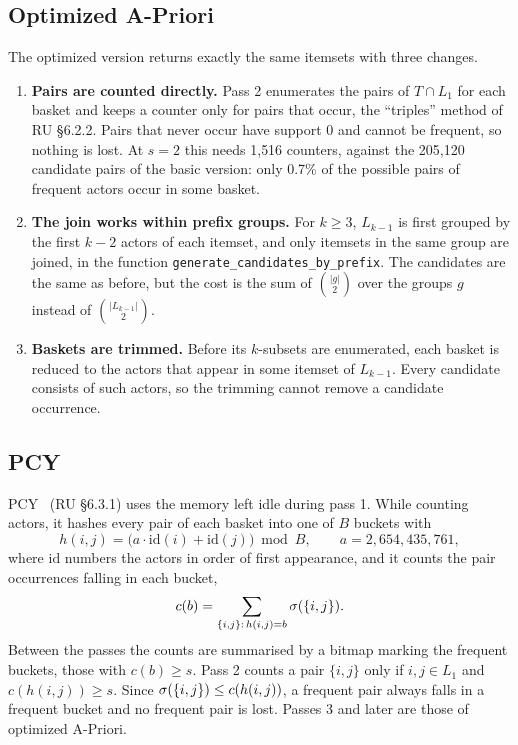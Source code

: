 \subsection{Optimized A-Priori}

The optimized version returns exactly the same itemsets with three changes.
\begin{enumerate}
  \item \textbf{Pairs are counted directly.} Pass 2 enumerates the pairs of $T \cap L_1$ for each basket and keeps a counter only for pairs that occur, the ``triples'' method of RU \S6.2.2. Pairs that never occur have support 0 and cannot be frequent, so nothing is lost. At $s = 2$ this needs 1{,}516 counters, against the 205{,}120 candidate pairs of the basic version: only 0.7\% of the possible pairs of frequent actors occur in some basket.
  \item \textbf{The join works within prefix groups.} For $k \ge 3$, $L_{k-1}$ is first grouped by the first $k - 2$ actors of each itemset, and only itemsets in the same group are joined, in the function
  \texttt{generate\_candidates\_by\_prefix}. The candidates are the same as before, but the cost is the sum of $\binom{|g|}{2}$ over the groups $g$ instead of $\binom{|L_{k-1}|}{2}$.
  \item \textbf{Baskets are trimmed.} Before its $k$-subsets are enumerated, each basket is reduced to the actors that appear in some itemset of $L_{k-1}$. Every candidate consists of such actors, so the trimming cannot remove a candidate occurrence.
\end{enumerate}

\subsection{PCY}

PCY~\cite{park1995} (RU \S6.3.1) uses the memory left idle during pass 1. While counting actors, it hashes every pair of each basket into one of $B$ buckets with
\[
  h(i, j) = \bigl(a \cdot \mathrm{id}(i) + \mathrm{id}(j)\bigr) \bmod B, \qquad a = 2{,}654{,}435{,}761,
\]
where $\mathrm{id}$ numbers the actors in order of first appearance, and it counts the pair occurrences falling in each bucket,
\[
  c(b) = \sum_{\{i, j\} :\, h(i, j) = b} \sigma(\{i, j\}).
\]
Between the passes the counts are summarised by a bitmap marking the frequent buckets, those with $c(b) \ge s$. Pass 2 counts a pair $\{i, j\}$ only if $i, j \in L_1$ and $c(h(i, j)) \ge s$. Since $\sigma(\{i, j\}) \le c(h(i, j))$, a frequent pair always falls in a frequent bucket and no frequent pair is lost. Passes 3 and later are those of optimized A-Priori.

